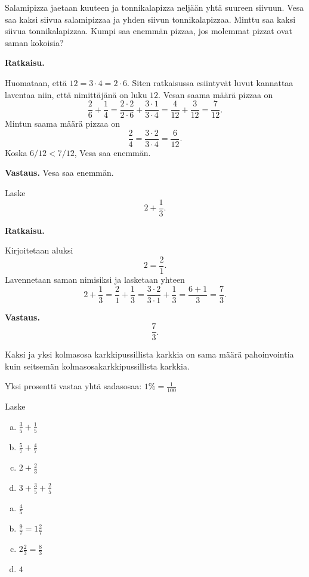 \begin{esimerkki}
Salamipizza jaetaan kuuteen ja tonnikalapizza neljään yhtä suureen siivuun. Vesa saa kaksi siivua salamipizzaa ja yhden siivun tonnikalapizzaa. Minttu saa kaksi siivua tonnikalapizzaa. Kumpi saa enemmän pizzaa, jos molemmat pizzat ovat saman kokoisia?


{\bf Ratkaisu.}

Huomataan, että $12 = 3\cdot 4 = 2\cdot 6$. Siten ratkaisussa esiintyvät luvut kannattaa laventaa niin, että nimittäjänä on luku $12$. Vesan saama määrä pizzaa on
\[
\frac{2}{6} + \frac{1}{4} = \frac{2\cdot 2}{2\cdot 6} + \frac{3\cdot 1}{3\cdot 4} 
=\frac{4}{12}+\frac{3}{12} = \frac{7}{12}.
\]
Mintun saama määrä pizzaa on
\[
\frac{2}{4} = \frac{3\cdot 2}{3\cdot 4} = \frac{6}{12}.
\]
Koska $6/12 < 7/12$, Vesa saa enemmän.

{\bf Vastaus.} Vesa saa enemmän.
\end{esimerkki}




\begin{esimerkki}
Laske
\[
2 + \frac{1}{3}.
\]

{\bf Ratkaisu.}

Kirjoitetaan aluksi
\[
2=\frac{2}{1}.
\]
Lavennetaan saman nimisiksi ja lasketaan yhteen
\[
2 + \frac{1}{3} = \frac{2}{1} + \frac{1}{3} = \frac{3 \cdot 2}{3 \cdot 1} + \frac{1}{3} = \frac{6+1}{3} = \frac{7}{3}.
\]

{\bf Vastaus.}
\[
\frac{7}{3}.
\]
\end{esimerkki}


Kaksi ja yksi kolmasosa karkkipussillista karkkia on sama määrä pahoinvointia kuin seitsemän kolmasosakarkkipussillista karkkia.


Yksi prosentti vastaa yhtä sadasosaa: $1 \% = \frac{1}{100}$

Laske %

\begin{tehtava}
    \begin{enumerate}[a)]
	\item $\frac{3}{5} + \frac{1}{5}$
	\item $\frac{5}{7} + \frac{4}{7}$
	\item $2 + \frac{2}{3}$
	\item$3 + \frac{3}{5} + \frac{2}{5}$   
    \end{enumerate}
    \begin{vastaus}
		\begin{enumerate}[a)]
			\item $\frac{4}{5}$
			\item $\frac{9}{7} = 1 \frac{2}{7}$
			\item $2 \frac{2}{3} = \frac{8}{3}$
			\item $4$
		\end{enumerate}
    \end{vastaus}
\end{tehtava}

